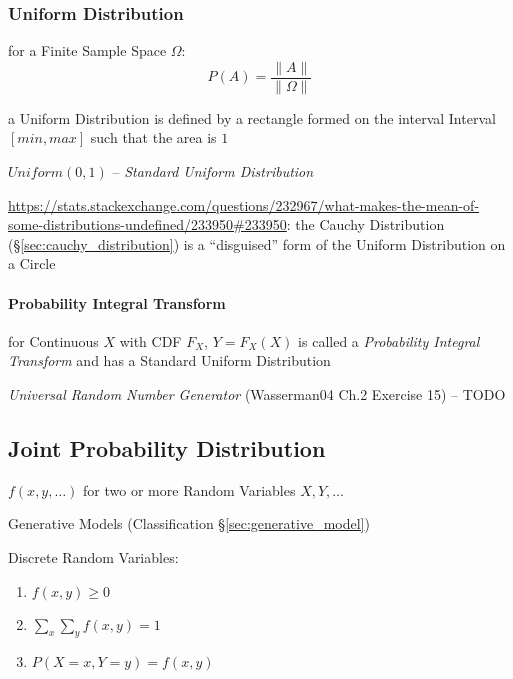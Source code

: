 \subsubsection{Uniform Distribution}\label{sec:uniform_distribution}

for a Finite Sample Space $\Omega$:
\[
  P(A) = \frac{\|A\|}{\|\Omega\|}
\]

a Uniform Distribution is defined by a rectangle formed on the interval Interval
$[min,max]$ such that the area is $1$

$Uniform(0,1)$ -- \emph{Standard Uniform Distribution}

\url{https://stats.stackexchange.com/questions/232967/what-makes-the-mean-of-some-distributions-undefined/233950#233950}:
the Cauchy Distribution (\S\ref{sec:cauchy_distribution}) is a ``disguised''
form of the Uniform Distribution on a Circle



\paragraph{Probability Integral Transform}
\label{sec:probability_integral_transform}\hfill

for Continuous $X$ with CDF $F_X$, $Y = F_X(X)$ is called a \emph{Probability
  Integral Transform} and has a Standard Uniform Distribution

\emph{Universal Random Number Generator} (Wasserman04 Ch.2 Exercise 15) -- TODO



\subsection{Joint Probability Distribution}\label{sec:joint_probability}

$f(x,y,\ldots)$ for two or more Random Variables $X,Y,\ldots$

\fist Generative Models (Classification \S\ref{sec:generative_model})

Discrete Random Variables:
\begin{enumerate}
  \item $f(x,y) \geq 0$
  \item $\sum_x \sum_y f(x,y) = 1$
  \item $P(X = x, Y = y) = f(x,y)$
\end{enumerate}

